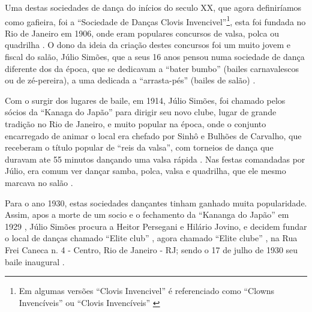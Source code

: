 Uma destas sociedades de dança do inícios do seculo XX, que agora definiríamos como gafieira, 
foi a ``Sociedade de Danças Clovis Invencivel''\footnote{Em algumas versões 
``Clovis Invencivel'' é referenciado como ``Clowns Invencíveis'' \cite[pp. 3 - cad. 3]{juliosimoes} ou 
``Clovis Invencíveis'' \cite[pp. 10]{simoesjournalbrasil1}}, 
esta foi fundada no Rio de Janeiro em 1906, 
onde eram populares concursos de valsa, polca ou quadrilha \cite[pp. 6 - cad. B]{entrevistajuliojournalbrasil1}.
O dono da ideia da criação destes concursos foi um muito jovem e fiscal do salão, Júlio Simões,
que a seus 16 anos pensou numa sociedade de dança diferente dos da época,
que se dedicavam a ``bater bumbo'' (bailes carnavalescos ou de zé-pereira), 
a uma dedicada a ``arrasta-pés'' (bailes de salão) 
\cite[pp. 6 - cad. B]{entrevistajuliojournalbrasil1} \cite[pp. 3 - cad. 3]{juliosimoes} \cite[pp. 10]{simoesjournalbrasil1}.

Com o surgir dos lugares de baile, em 1914,  
Júlio Simões, foi chamado pelos sócios da ``Kanaga do Japão'' para dirigir seu novo clube,
lugar de grande tradição no Rio de Janeiro, e muito popular na época,
onde o conjunto encarregado de animar o local era chefado por Sinhô e Bulhões de Carvalho,
que receberam o título popular de ``reis da valsa'',
com torneios de dança que duravam ate 55 
minutos dançando uma valsa rápida \cite[pp. 3 - cad. 3]{juliosimoes} \cite[pp. 1 - cad. B]{gafieira2000reis} \cite[pp. 6 - cad. B]{entrevistajuliojournalbrasil1}.
Nas festas comandadas por Júlio, era comum ver dançar samba, polca, 
valsa e quadrilha, que ele mesmo marcava no salão \cite[pp. 1 - cad. B]{gafieira2000reis}. 


Para o ano 1930, estas sociedades dançantes tinham ganhado muita popularidade. 
Assim, apos a morte de um socio e o fechamento da ``Kananga do Japão'' 
em 1929 \cite[pp. 3 - cad. 3]{juliosimoes}  \cite[pp. 11]{eliteinaugura}, 
Júlio Simões procura a Heitor Persegani e  Hilário Jovino, 
e decidem fundar o local de danças chamado ``Elite club'' \cite[pp. 11]{eliteinaugura} \cite[pp. 13]{respeitojournalbrasil1},
agora chamado ``Elite clube'' \cite[pp. 3 - cad. 3]{juliosimoes},
na Rua Frei Caneca n. 4 - Centro, Rio de Janeiro - RJ;
sendo o 17 de julho de 1930 seu baile inaugural 
\cite[pp. 11]{eliteinaugura} \cite[pp. 3 - cad. 3]{juliosimoes} \cite[pp. 10]{simoesjournalbrasil1}.

